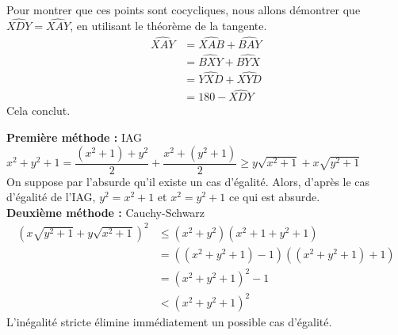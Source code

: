 \begin{sol}
Pour montrer que ces points sont cocycliques, nous allons démontrer que $\widehat{XDY} = \widehat{XAY}$, en utilisant le théorème de la tangente. 
\begin{align*} 
\widehat{XAY} &= \widehat{XAB}+ \widehat{BAY} \\
& = \widehat{BXY} + \widehat{BYX} \\
& = \widehat{YXD} + \widehat{XYD} \\
& = 180 - \widehat{XDY}
\end{align*}
Cela conclut.
\end{sol}

\begin{sol}
\textbf{Première méthode :} IAG \\
$x^2 + y^2 + 1 = \dfrac{(x^2+1)+y^2}{2} + \dfrac{x^2+(y^2+1)}{2} \ge y\sqrt{x^2+1}+x\sqrt{y^2+1}$ \\
On suppose par l'absurde qu'il existe un cas d'égalité. Alors, d'après le cas d'égalité de l'IAG, $y^2=x^2+1$ et $x^2 = y^2+1$ ce qui est absurde. \\
\textbf{Deuxième méthode :} Cauchy-Schwarz
\begin{align*}
\left( x\sqrt{y^2 + 1} + y \sqrt{x^2 + 1} \right)^2 &\le \left(x^2 + y^2\right) \left(x^2 + 1 + y^2 + 1\right) \\ 
& = \left(\left(x^2 + y^2 + 1\right) - 1\right) \left(\left( x^2 + y^2 + 1\right) + 1\right) \\
& = \left(x^2 + y^2 + 1\right)^2 - 1 \\
& < \left(x^2 + y^2 + 1\right)^2 
\end{align*}
L'inégalité stricte élimine immédiatement un possible cas d'égalité.
\end{sol}



